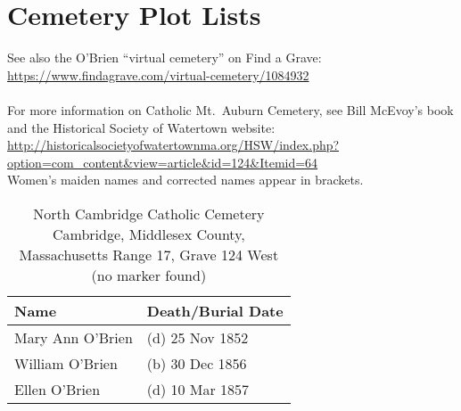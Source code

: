 \section{Cemetery Plot Lists}

\setlength{\parindent}{0cm}

See also the O'Brien ``virtual cemetery'' on Find a Grave: \url{https://www.findagrave.com/virtual-cemetery/1084932}\\
\\
For more information on Catholic Mt.\ Auburn Cemetery, see Bill McEvoy's book and the Historical Society of Watertown website: \url{http://historicalsocietyofwatertownma.org/HSW/index.php?option=com_content&view=article&id=124&Itemid=64}
\\
Women's maiden names and corrected names appear in brackets.

\begin{table}[ht]
	\centering
		\caption{North Cambridge Catholic Cemetery\cite{DianaBerberenaLetter1} \\
		Cambridge, Middlesex County, Massachusetts
		Range 17, Grave 124 West (no marker found)}
	\begin{tabular}{|l|l|}
		\hline
		\textbf{Name} & \textbf{Death/Burial Date} \\
		\hline
	Mary Ann O'Brien\index{O'Brien!Mary Ann\textsuperscript{3} (1852--1852)} & (d) 25 Nov 1852 \\
	\hline
	William O'Brien\index{O'Brien!William\textsuperscript{1}} & (b) 30 Dec 1856 \\
	\hline
	Ellen O'Brien\index{O'Brien!Ellen\textsuperscript{3} (1853--1857)} & (d) 10 Mar 1857 \\
	\hline
	\end{tabular}
\end{table}

